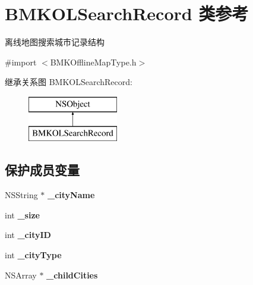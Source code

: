 \hypertarget{interface_b_m_k_o_l_search_record}{\section{B\-M\-K\-O\-L\-Search\-Record 类参考}
\label{interface_b_m_k_o_l_search_record}
}


离线地图搜索城市记录结构  




{\ttfamily \#import $<$B\-M\-K\-Offline\-Map\-Type.\-h$>$}

继承关系图 B\-M\-K\-O\-L\-Search\-Record\-:\begin{figure}[H]
\begin{center}
\leavevmode
\includegraphics[height=2.000000cm]{interface_b_m_k_o_l_search_record}
\end{center}
\end{figure}
\subsection*{保护成员变量}
\begin{DoxyCompactItemize}
\item 
\hypertarget{interface_b_m_k_o_l_search_record_abb283493e35764e63a41766d40f9f016}{N\-S\-String $\ast$ {\bfseries \-\_\-city\-Name}}\label{interface_b_m_k_o_l_search_record_abb283493e35764e63a41766d40f9f016}

\item 
\hypertarget{interface_b_m_k_o_l_search_record_a16e88995e8c282f3aa7a1dc72cdc9580}{int {\bfseries \-\_\-size}}\label{interface_b_m_k_o_l_search_record_a16e88995e8c282f3aa7a1dc72cdc9580}

\item 
\hypertarget{interface_b_m_k_o_l_search_record_a9ed9011244b41c5360e7d9bd010d7e53}{int {\bfseries \-\_\-city\-I\-D}}\label{interface_b_m_k_o_l_search_record_a9ed9011244b41c5360e7d9bd010d7e53}

\item 
\hypertarget{interface_b_m_k_o_l_search_record_abda23ccbf5aa6fe33911d76a268f013d}{int {\bfseries \-\_\-city\-Type}}\label{interface_b_m_k_o_l_search_record_abda23ccbf5aa6fe33911d76a268f013d}

\item 
\hypertarget{interface_b_m_k_o_l_search_record_a0e6d2797e93de33955702cf362f6ab08}{N\-S\-Array $\ast$ {\bfseries \-\_\-child\-Cities}}\label{interface_b_m_k_o_l_search_record_a0e6d2797e93de33955702cf362f6ab08}

\end{DoxyCompactItemize}
